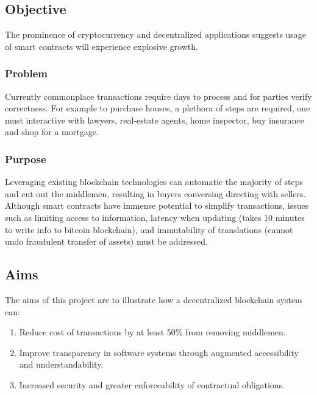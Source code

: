 \subsection{Objective}
The prominence of cryptocurrency and decentralized applications suggests usage of smart contracts will experience explosive growth.

\subsubsection{Problem}

Currently commonplace transactions require days to process and for parties verify correctness. For example to purchase houses, a plethora of steps are required, one must interactive with lawyers, real-estate agents, home inspector, buy insurance and shop for a mortgage. 

\subsubsection{Purpose}
Leveraging existing blockchain technologies can automatic the majority of steps and cut out the middlemen, resulting in buyers conversing directing with sellers.
Although smart contracts have immense potential to simplify transactions, issues such as limiting access to information, latency when updating (takes 10 minutes to write info to bitcoin blockchain), and immutability of translations (cannot undo fraudulent transfer of assets) must be addressed.
\subsection{Aims}
The aims of this project are to illustrate how a decentralized blockchain system can:
\begin{enumerate}
\item Reduce cost of transactions by at least 50\% from removing middlemen.
\item Improve transparency in software systems through augmented accessibility and understandability.
\item Increased security and greater enforceability of contractual obligations.
\end{enumerate}
